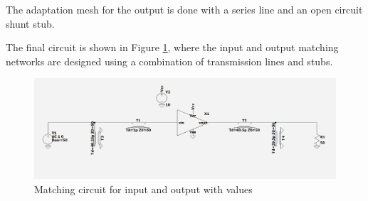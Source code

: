 The adaptation mesh for the output is done with a series line and an open circuit shunt stub.

The final circuit is shown in Figure \ref{fig:MatchingCircuit-line}, where the input and output matching networks are designed using a combination of transmission lines and stubs.

\begin{figure}[H]
    \centering
    \includegraphics[width=1\textwidth]{Images/LS_matching-circuit.png}
    \caption{Matching circuit for input and output with values}
    \label{fig:MatchingCircuit-line}
\end{figure}

